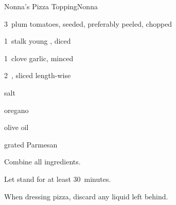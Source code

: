 \begin{recipe}{Nonna's Pizza Topping}{Nonna}{}

\begin{ingredients}
\item 3~plum tomatoes, seeded, preferably peeled, chopped
\item 1~stalk young , diced
\item 1~clove garlic, minced
\item 2~, sliced length-wise
\item salt
\item oregano
\item olive oil
\item grated Parmesan
\end{ingredients}

\begin{directions}
\item Combine all ingredients.
\item Let stand for at least 30~minutes.
\item When dressing pizza, discard any liquid left behind.
\end{directions}

\end{recipe}
